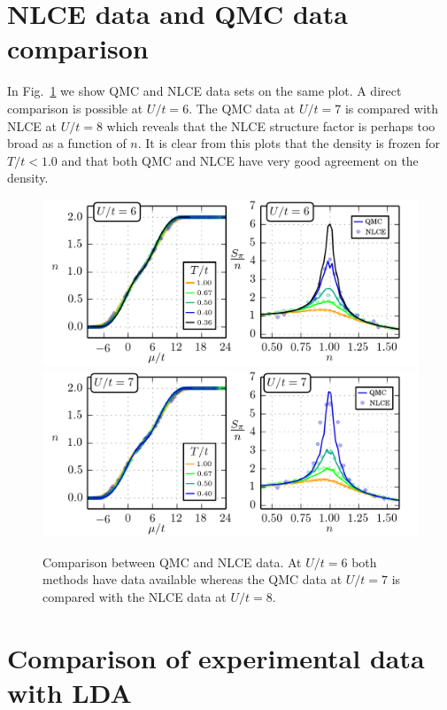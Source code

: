 \documentclass[11pt,letter]{article}
\begin{document}
\section{ NLCE data and QMC data comparison} 

In Fig.~\ref{fig:QMCvsNLCE} we show QMC and NLCE data sets on the same
plot.  A direct comparison is possible at $U/t=6$.  The QMC data at
$U/t=7$ is compared with NLCE at $U/t=8$ which reveals that the NLCE structure
factor is perhaps too broad as a function of $n$.   It is clear from this plots
that the density is frozen for $T/t < 1.0$ and that both QMC and NLCE have very
good agreement on the density. 
\begin{figure}
    \centering
\includegraphics[width=\textwidth]{../dataplots/QMC_Final/QMC_NLCE_Compare_U06.png}
\includegraphics[width=\textwidth]{../dataplots/QMC_Final/QMC_NLCE_Compare_U07.png}
\caption{Comparison between QMC and NLCE data.  At $U/t=6$ both methods have
data available whereas the QMC data at $U/t=7$ is compared with the NLCE data
at $U/t=8$.}
\label{fig:QMCvsNLCE}
\end{figure}


\section{ Comparison of experimental data with LDA } 
\end{document}
